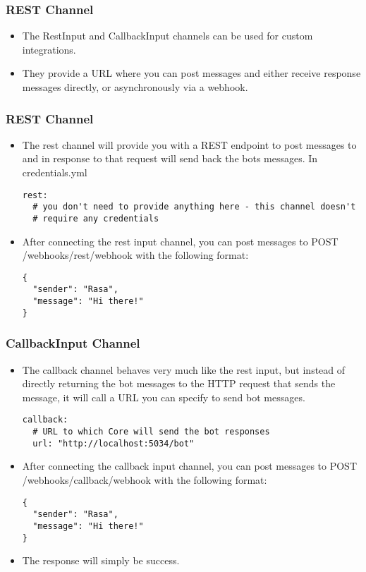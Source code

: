 \begin{frame}[fragile]\frametitle{REST Channel}
 \begin{itemize}
\item The RestInput and CallbackInput channels can be used for custom integrations. 
\item They provide a URL where you can post messages and either receive response messages directly, or asynchronously via a webhook.
\end{itemize}

\end{frame} 

 \begin{frame}[fragile]\frametitle{REST Channel}
 \begin{itemize}
\item The rest channel will provide you with a REST endpoint to post messages to and in response to that request will send back the bots messages. In credentials.yml
\begin{lstlisting}
rest:
  # you don't need to provide anything here - this channel doesn't
  # require any credentials
\end{lstlisting}
\item After connecting the rest input channel, you can post messages to POST /webhooks/rest/webhook with the following format:
\begin{lstlisting}
{
  "sender": "Rasa",
  "message": "Hi there!"
}
\end{lstlisting}
\end{itemize}

\end{frame} 

 \begin{frame}[fragile]\frametitle{CallbackInput Channel}
 \begin{itemize}
\item The callback channel behaves very much like the rest input, but instead of directly returning the bot messages to the HTTP request that sends the message, it will call a URL you can specify to send bot messages.
\begin{lstlisting}
callback:
  # URL to which Core will send the bot responses
  url: "http://localhost:5034/bot"
\end{lstlisting}
\item After connecting the callback input channel, you can post messages to POST /webhooks/callback/webhook with the following format:
\begin{lstlisting}
{
  "sender": "Rasa",
  "message": "Hi there!"
}
\end{lstlisting}
\item The response will simply be success.
\end{itemize}

\end{frame} 

